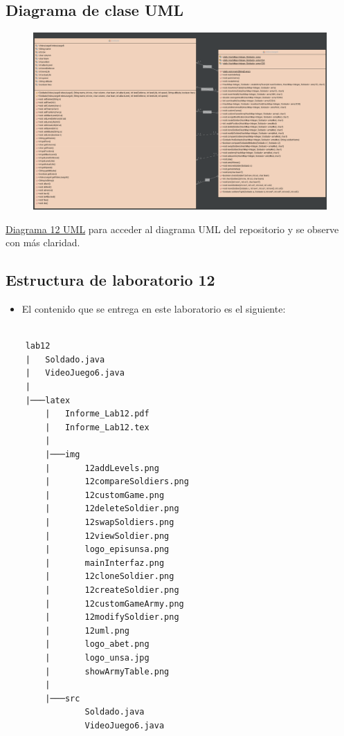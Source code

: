 \documentclass{article}
\begin{document}
\newpage

\subsection{Diagrama de clase UML}
\begin{figure}[H]
    \centering
    \includegraphics[width=1.1
    \textwidth,keepaspectratio]{img/12uml.png}
    \caption{}
\end{figure}

\href{https://github.com/hernanchoquehuanca/fp2-23b/blob/main/fase02/lab12/latex/img/12uml.png}{Diagrama 12 UML} para acceder al diagrama UML del repositorio y se observe con más claridad.


\newpage

\subsection{Estructura de laboratorio 12} %
\begin{itemize}	
	\item El contenido que se entrega en este laboratorio es el siguiente:
\end{itemize}


\begin{lstlisting}[style=ascii-tree]

    lab12
    |   Soldado.java
    |   VideoJuego6.java
    |
    |───latex
        |   Informe_Lab12.pdf
        |   Informe_Lab12.tex
        |
        |───img
        |       12addLevels.png     
        |       12compareSoldiers.png  
        |       12customGame.png      
        |       12deleteSoldier.png  
        |       12swapSoldiers.png  
        |       12viewSoldier.png  
        |       logo_episunsa.png  
        |       mainInterfaz.png
        |       12cloneSoldier.png  
        |       12createSoldier.png    
        |       12customGameArmy.png  
        |       12modifySoldier.png  
        |       12uml.png           
        |       logo_abet.png      
        |       logo_unsa.jpg      
        |       showArmyTable.png
        |
        |───src
                Soldado.java
                VideoJuego6.java

\end{lstlisting}    
\end{document}
